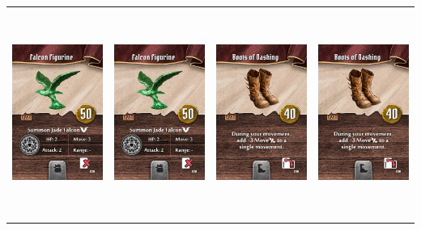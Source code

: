 \documentclass{minimal}
\begin{document}
{\begin{longtable}{llll}
\includegraphics[width=44mm,height=68mm]{./29-35/gh-035-falcon-figurine.png} &
\includegraphics[width=44mm,height=68mm]{./29-35/gh-035-falcon-figurine.png} &
\includegraphics[width=44mm,height=68mm]{./36-42/gh-036-boots-of-dashing.png} &
\includegraphics[width=44mm,height=68mm]{./36-42/gh-036-boots-of-dashing.png}\\ 

\end{longtable}}
\end{document}
